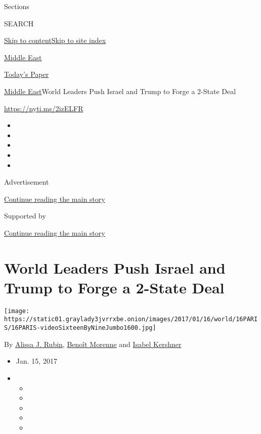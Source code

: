 Sections

SEARCH

\protect\hyperlink{site-content}{Skip to
content}\protect\hyperlink{site-index}{Skip to site index}

\href{https://www.nytimes3xbfgragh.onion/section/world/middleeast}{Middle
East}

\href{https://myaccount.nytimes3xbfgragh.onion/auth/login?response_type=cookie\&client_id=vi}{}

\href{https://www.nytimes3xbfgragh.onion/section/todayspaper}{Today's
Paper}

\href{/section/world/middleeast}{Middle East}\textbar{}World Leaders
Push Israel and Trump to Forge a 2-State Deal

\url{https://nyti.ms/2izELFR}

\begin{itemize}
\item
\item
\item
\item
\item
\end{itemize}

Advertisement

\protect\hyperlink{after-top}{Continue reading the main story}

Supported by

\protect\hyperlink{after-sponsor}{Continue reading the main story}

\hypertarget{world-leaders-push-israel-and-trump-to-forge-a-2-state-deal}{%
\section{World Leaders Push Israel and Trump to Forge a 2-State
Deal}\label{world-leaders-push-israel-and-trump-to-forge-a-2-state-deal}}

\texttt{[image: https://static01.graylady3jvrrxbe.onion/images/2017/01/16/world/16PARIS/16PARIS-videoSixteenByNineJumbo1600.jpg]}

By \href{https://www.nytimes3xbfgragh.onion/by/alissa-j-rubin}{Alissa J.
Rubin},
\href{https://www.nytimes3xbfgragh.onion/by/benoit-morenne}{Benoît
Morenne} and
\href{https://www.nytimes3xbfgragh.onion/by/isabel-kershner}{Isabel
Kershner}

\begin{itemize}
\item
  Jan. 15, 2017
\item
  \begin{itemize}
  \item
  \item
  \item
  \item
  \item
  \end{itemize}
\end{itemize}

